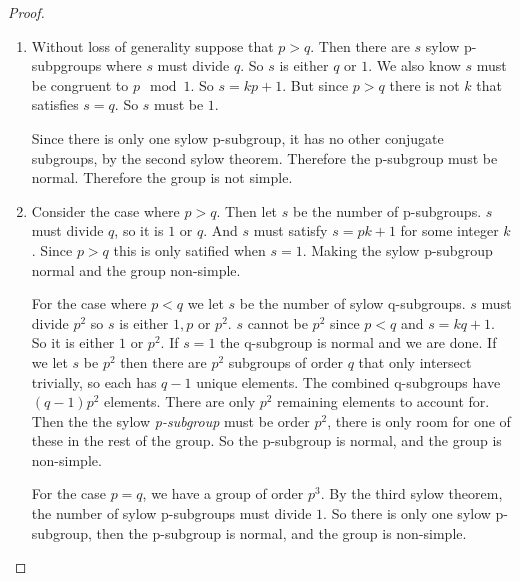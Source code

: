 \documentclass[12pt]{article}
\begin{document}
\begin{proof}

    \begin{enumerate}
        \item Without loss of generality suppose that $p > q$. Then
            there are $s$ sylow p-subpgroups where $s$ must divide $q$.
            So $s$ is either $q$ or $1$. We also know $s$ must be
            congruent to $p \mod 1$. So $s = kp + 1$. But since $p > q$
            there is not $k$ that satisfies $s = q$. So $s$ must be $1$. 

            Since there is only one sylow p-subgroup, it has no other
            conjugate subgroups, by the second sylow theorem. Therefore
            the p-subgroup must be normal. Therefore the group is not
            simple.

        \item Consider the case where $p > q$. Then let $s$ be the
            number of p-subgroups. $s$ must divide $q$, so it is $1$ or
            $q$. And $s$ must satisfy $s =
            pk + 1$ for some integer $k$. Since $p > q$ this is only
            satified when $s = 1$. Making the sylow p-subgroup normal
            and the group non-simple.

            For the case where $p < q$ we let $s$ be the number of sylow
            q-subgroups. $s$ must divide $p^2$ so $s$ is either $1, p$
            or $p^2$. $s$ cannot be $p^2$ since $p < q$ and $s = kq +
            1$. So it is either $1$ or $p^2$. If $s = 1$ the q-subgroup
            is normal and we are done. If we let $s$ be $p^2$ then there
            are $p^2$ subgroups of order $q$ that only intersect
            trivially, so each has $q-1$ unique elements. The combined
            q-subgroups have $(q-1)p^2$ elements. There are only $p^2$
            remaining elements to account for. Then the the sylow
            \textit{p-subgroup} must be order $p^2$, there is only room
            for one of these in the rest of the group. So the p-subgroup
            is normal, and the group is non-simple.

            For the case $p = q$, we have a group of order $p^3$. By the
            third sylow theorem, the number of sylow p-subgroups must
            divide $1$. So there is only one sylow p-subgroup, then the
            p-subgroup is normal, and the group is non-simple.

    \end{enumerate}

\end{proof}
\end{document}
